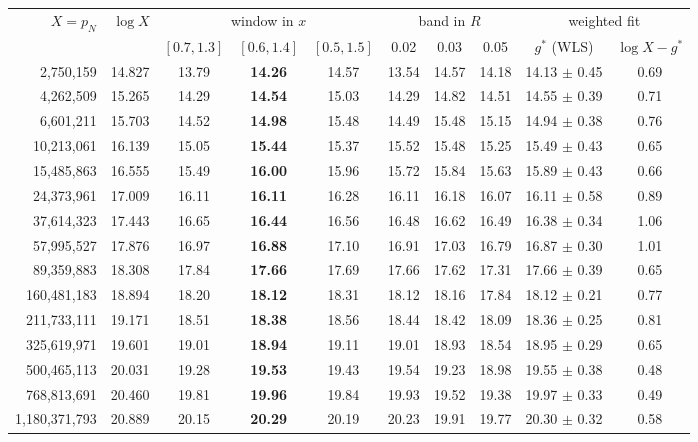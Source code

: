 \begin{tabular}{rr ccc ccc c c}
\toprule
$X=p_N$ & $\log X$ & \multicolumn{3}{c}{window in $x$} & \multicolumn{3}{c}{band in $R$} & \multicolumn{2}{c}{weighted fit} \\
\cmidrule(lr){3-5}\cmidrule(lr){6-8}
 & & $[0.7,1.3]$ & $[0.6,1.4]$ & $[0.5,1.5]$ & 0.02 & 0.03 & 0.05 & $g^*$ (WLS) & $\log X-g^*$ \\
\midrule
2{,}750{,}159 & 14.827 & 13.79 & \textbf{14.26} & 14.57 & 13.54 & 14.57 & 14.18 & 14.13 $\pm$ 0.45 & 0.69 \\
4{,}262{,}509 & 15.265 & 14.29 & \textbf{14.54} & 15.03 & 14.29 & 14.82 & 14.51 & 14.55 $\pm$ 0.39 & 0.71 \\
6{,}601{,}211 & 15.703 & 14.52 & \textbf{14.98} & 15.48 & 14.49 & 15.48 & 15.15 & 14.94 $\pm$ 0.38 & 0.76 \\
10{,}213{,}061 & 16.139 & 15.05 & \textbf{15.44} & 15.37 & 15.52 & 15.48 & 15.25 & 15.49 $\pm$ 0.43 & 0.65 \\
15{,}485{,}863 & 16.555 & 15.49 & \textbf{16.00} & 15.96 & 15.72 & 15.84 & 15.63 & 15.89 $\pm$ 0.43 & 0.66 \\
24{,}373{,}961 & 17.009 & 16.11 & \textbf{16.11} & 16.28 & 16.11 & 16.18 & 16.07 & 16.11 $\pm$ 0.58 & 0.89 \\
37{,}614{,}323 & 17.443 & 16.65 & \textbf{16.44} & 16.56 & 16.48 & 16.62 & 16.49 & 16.38 $\pm$ 0.34 & 1.06 \\
57{,}995{,}527 & 17.876 & 16.97 & \textbf{16.88} & 17.10 & 16.91 & 17.03 & 16.79 & 16.87 $\pm$ 0.30 & 1.01 \\
89{,}359{,}883 & 18.308 & 17.84 & \textbf{17.66} & 17.69 & 17.66 & 17.62 & 17.31 & 17.66 $\pm$ 0.39 & 0.65 \\
160{,}481{,}183 & 18.894 & 18.20 & \textbf{18.12} & 18.31 & 18.12 & 18.16 & 17.84 & 18.12 $\pm$ 0.21 & 0.77 \\
211{,}733{,}111 & 19.171 & 18.51 & \textbf{18.38} & 18.56 & 18.44 & 18.42 & 18.09 & 18.36 $\pm$ 0.25 & 0.81 \\
325{,}619{,}971 & 19.601 & 19.01 & \textbf{18.94} & 19.11 & 19.01 & 18.93 & 18.54 & 18.95 $\pm$ 0.29 & 0.65 \\
500{,}465{,}113 & 20.031 & 19.28 & \textbf{19.53} & 19.43 & 19.54 & 19.23 & 18.98 & 19.55 $\pm$ 0.38 & 0.48 \\
768{,}813{,}691 & 20.460 & 19.81 & \textbf{19.96} & 19.84 & 19.93 & 19.52 & 19.38 & 19.97 $\pm$ 0.33 & 0.49 \\
1{,}180{,}371{,}793 & 20.889 & 20.15 & \textbf{20.29} & 20.19 & 20.23 & 19.91 & 19.77 & 20.30 $\pm$ 0.32 & 0.58 \\

\end{tabular}
